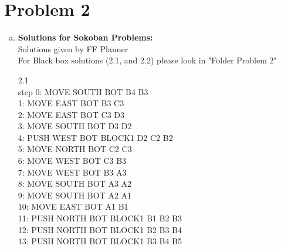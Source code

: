 \documentclass[]{article}
\begin{document}
\section{Problem 2}
	\begin{enumerate}[(a)]
		\item \textbf{Solutions for Sokoban Problems:}\\
		Solutions given by FF Planner\\
		For Black box solutions (2.1, and 2.2) please look in "Folder Problem 2"
		
		2.1\\
		step    0: MOVE SOUTH BOT B4 B3\\
		        1: MOVE EAST BOT B3 C3\\
		        2: MOVE EAST BOT C3 D3\\
		        3: MOVE SOUTH BOT D3 D2\\
		        4: PUSH WEST BOT BLOCK1 D2 C2 B2\\
		        5: MOVE NORTH BOT C2 C3\\
		        6: MOVE WEST BOT C3 B3\\
		        7: MOVE WEST BOT B3 A3\\
		        8: MOVE SOUTH BOT A3 A2\\
		        9: MOVE SOUTH BOT A2 A1\\
		       10: MOVE EAST BOT A1 B1\\
		       11: PUSH NORTH BOT BLOCK1 B1 B2 B3\\
		       12: PUSH NORTH BOT BLOCK1 B2 B3 B4\\
		       13: PUSH NORTH BOT BLOCK1 B3 B4 B5\\
		

\end{enumerate}
\end{document}
